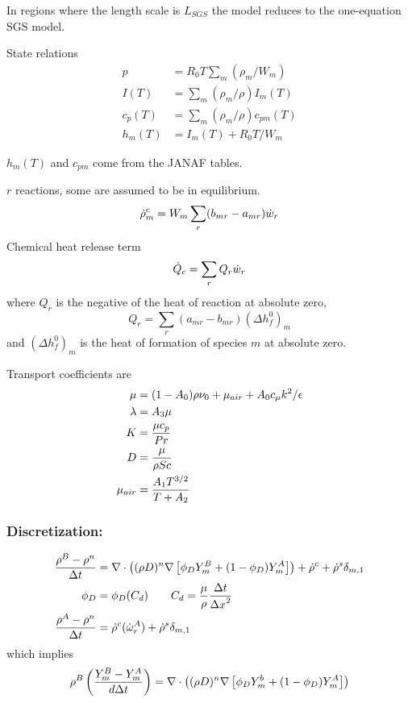 \documentclass[10pt]{article}
\begin{document}
In regions where the length scale is $L_{SGS}$ the model reduces to the one-equation SGS model.

State relations
\begin{align*}
   p &= R_0 T \sum_m (\rho_m/W_m) \\
  I(T) &= \sum_m (\rho_m/\rho) I_m(T) \\
  c_p(T) &= \sum_m (\rho_m/\rho) c_{pm}(T) \\
  h_m(T) &= I_m(T) + R_0 T /W_m
\end{align*}

$h_m(T)$ and $c_{pm}$ come from the JANAF tables.

$r$ reactions, some are assumed to be in equilibrium.
\[
  \dot{\rho}^c_m = W_m \sum_r  (b_{mr} - a_{mr}) \dot{w}_r 
\]
Chemical heat release term
\[
   \dot{Q}_c = \sum_r Q_r \dot{w}_r
\]
where $Q_r$ is the negative of the heat of reaction at absolute zero,
\[
 Q_r = \sum_r (a_{mr} -b_{mr}) (\Delta h_f^0)_m
\]
and $(\Delta h_f^0)_m$ is the heat of formation of species $m$ at absolute zero.

Transport coefficients are
\begin{align*}
  \mu & = (1-A_0) \rho \nu_0 + \mu_{air} + A_0 c_\mu k^2/\epsilon \\
  \lambda &= A_3 \mu \\
  K &= {\mu c_p \over Pr} \\
  D &= {\mu \over \rho Sc} \\
  \mu_{air} &= { A_1 T^{3/2} \over T+A_2}
\end{align*}


\subsubsection{Discretization:}

\begin{align}
    { \rho^B - \rho^n \over {\Delta t}} 
         & = \nabla\cdot\left(  (\rho D)^n \nabla\left[ \phi_D Y_m^B + (1-\phi_D) Y_m^A\right] \right)
              + \dot{\rho}^c + \dot{\rho}^s \delta_{m,1}  \\ 
   \phi_D &= \phi_D(C_d) \qquad C_d = {\mu\over \rho} {{\Delta t} \over {\Delta x}^2} \\
   {\rho^A-\rho^n \over {\Delta t}} &= \dot{\rho}^c( \dot{\omega}_r^A ) + \dot{\rho}^s \delta_{m,1} 
\end{align}
which implies
\[
    \rho^B \left({ Y_m^B - Y_m^A \over d{\Delta t}}\right)
         = \nabla\cdot\left(  (\rho D)^n \nabla\left[ \phi_D Y_m^b + (1-\phi_D) Y_m^A\right]\right)
\]   
\end{document}
